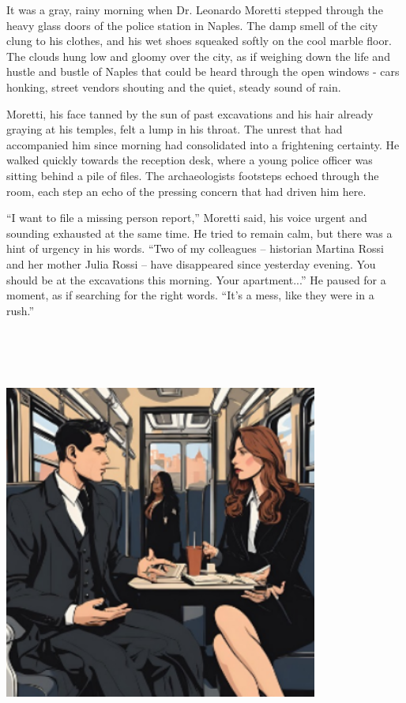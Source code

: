 \documentclass[
]{article}
\begin{document}
It was a gray, rainy morning when Dr. Leonardo Moretti stepped through
the heavy glass doors of the police station in Naples. The damp smell of
the city clung to his clothes, and his wet shoes squeaked softly on the
cool marble floor. The clouds hung low and gloomy over the city, as if
weighing down the life and hustle and bustle of Naples that could be
heard through the open windows - cars honking, street vendors shouting
and the quiet, steady sound of rain.

Moretti, his face tanned by the sun of past excavations and his hair
already graying at his temples, felt a lump in his throat. The unrest
that had accompanied him since morning had consolidated into a
frightening certainty. He walked quickly towards the reception desk,
where a young police officer was sitting behind a pile of files. The
archaeologist\textquotesingle s footsteps echoed through the room, each
step an echo of the pressing concern that had driven him here.

``I want to file a missing person report,'' Moretti said, his voice
urgent and sounding exhausted at the same time. He tried to remain calm,
but there was a hint of urgency in his words. ``Two of my colleagues --
historian Martina Rossi and her mother Julia Rossi -- have disappeared
since yesterday evening. You should be at the excavations this morning.
Your apartment...'' He paused for a moment, as if searching for the
right words. ``It's a mess, like they were in a rush.''

\includegraphics[width=4.0625in,height=5.61458in]{media/image3.png}
\end{document}
